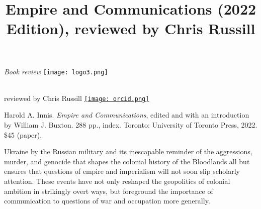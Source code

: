 \documentclass{tufte-handout}
\title[Review of Innis]{Empire and Communications (2022 Edition), reviewed by Chris Russill} %
\begin{document}
\begin{titlepage}

\begin{fullwidth}
\noindent\LARGE\emph{Book review
} \hspace{88mm}\texttt{[image: logo3.png]}\\
\noindent\hrulefill\\
\vspace*{1em}

\vspace*{1.5em}

\noindent\LARGE{reviewed by Chris Russill} \href{https://orcid.org/0009-0001-4921-0151}{\texttt{[image: orcid.png]}}\par{}
\vspace*{0.5em}
 



\end{fullwidth}

\vspace*{1em}


\noindent\small{Harold A. Innis. \emph{Empire and Communications}, edited and with an
introduction by William J. Buxton. 288 pp., index. Toronto: University
of Toronto Press, 2022. \$45 (paper).}



\vspace*{0.25em}



 Ukraine by the Russian military and its inescapable
reminder of the aggressions, murder, and genocide that shapes the
colonial history of the Bloodlands all but ensures that questions of
empire and imperialism will not soon slip scholarly attention. These
events have not only reshaped the geopolitics of colonial ambition in
strikingly overt ways, but foreground the importance of communication to
questions of war and occupation more generally.


\end{titlepage}
\end{document}
